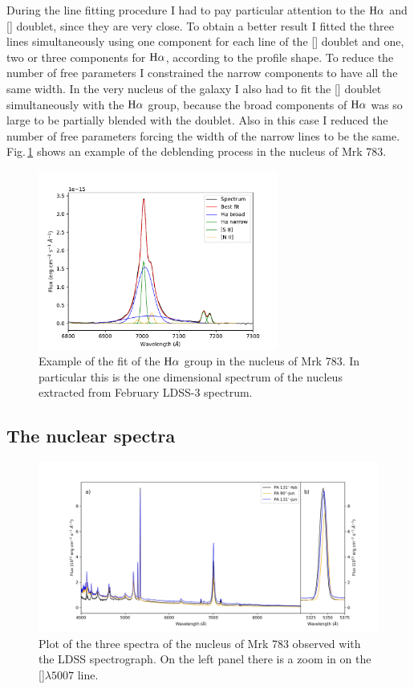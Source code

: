 \documentclass[../thesis.tex]{subfiles}
\begin{document}
During the line fitting procedure I had to pay particular attention to the $\rm H\alpha$ and [] doublet, since they are very close.
To obtain a better result I fitted the three lines simultaneously using one component for each line of the [] doublet and one, two or three components for $\rm H\alpha$, according to the profile shape.
To reduce the number of free parameters I constrained the narrow components to have all the same width.
In the very nucleus of the galaxy I also had to fit the [] doublet  simultaneously with the $\rm H\alpha$ group, because the broad components of $\rm H\alpha$ was so large to be partially blended with the doublet.
Also in this case I reduced the number of free parameters forcing the width of the narrow lines to be the same.
Fig.\,\ref{fig:pap3_deblending} shows an example of the deblending process in the nucleus of Mrk 783.

\begin{figure}
\centering
\includegraphics[width=0.7\textwidth]{images/paper3/deblending.pdf} 
\caption[]{Example of the fit of the $\rm H\alpha$ group in the nucleus of Mrk 783. In particular this is the one dimensional spectrum of the nucleus extracted from February LDSS-3 spectrum.} 
\label{fig:pap3_deblending}
\end{figure} 


\subsection{The nuclear spectra}

\begin{figure}
\centering
\includegraphics[width=\textwidth]{images/paper3/all_spectra.jpg} 
\caption[]{Plot of the three spectra of the nucleus of Mrk 783 observed with the LDSS spectrograph. On the left panel there is a zoom in on the []$\lambda5007$ line.} 
\label{fig:all_spectra}
\end{figure} 
\end{document}
